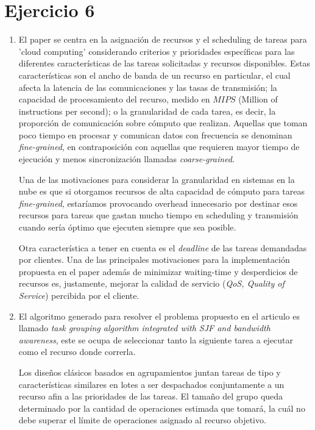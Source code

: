 \section{Ejercicio 6}

\begin{enumerate}[label=\alph*)]

    \item

	El paper se centra en la asignación de recursos y el scheduling de tareas para 'cloud computing' considerando criterios y prioridades específicas para las diferentes características de las tareas solicitadas y recursos disponibles. Estas características son el ancho de banda de un recurso en particular, el cual afecta la latencia de las comunicaciones y las tasas de transmisión;
la capacidad de procesamiento del recurso, medido en $MIPS$ (Million of instructions per second); o la granularidad de cada tarea, es decir, la proporción de comunicación sobre cómputo que realizan. Aquellas que toman poco tiempo en procesar y comunican datos con frecuencia se denominan \emph{fine-grained}, en contraposición con aquellas que requieren mayor tiempo de ejecución y menos sincronización llamadas \emph{coarse-grained}. 

	Una de las motivaciones para considerar la granularidad en sistemas en la nube es que si otorgamos recursos de alta capacidad de cómputo para tareas \emph{fine-grained}, estaríamos provocando overhead innecesario por destinar esos recursos para tareas que gastan mucho tiempo en scheduling y transmisión cuando sería óptimo que ejecuten siempre que sea posible.
	
	Otra característica a tener en cuenta es el \emph{deadline} de las tareas demandadas por clientes. Una de las principales motivaciones para la implementación propuesta en el paper además de minimizar waiting-time y desperdicios de recursos es, justamente, mejorar la calidad de servicio (\emph{QoS, Quality of Service}) percibida por el cliente.

    \item El algoritmo generado para resolver el problema propuesto en el articulo es llamado \emph{task grouping
algorithm integrated with SJF and bandwidth awareness}, este se ocupa de seleccionar tanto
        la siguiente tarea a ejecutar como el recurso donde correrla.

        Los diseños clásicos basados en agrupamientos juntan tareas de tipo
        y características similares en lotes a ser despachados conjuntamente
        a un recurso afin a las prioridades de las tareas.
        El tamaño del grupo queda determinado por la cantidad de operaciones
        estimada que tomará, la cuál no debe superar el límite de operaciones
        asignado al recurso objetivo.


\end{enumerate}
